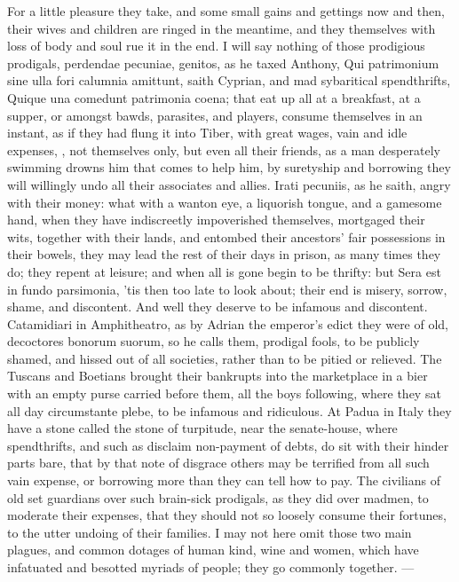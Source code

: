 {For a little pleasure they take, and some small gains and gettings now
and then, their wives and children are ringed in the meantime, and they
themselves with loss of body and soul rue it in the end. I will say
nothing of those prodigious prodigals, perdendae pecuniae, genitos, as
he  taxed Anthony, Qui patrimonium sine ulla fori calumnia
amittunt, saith Cyprian, and mad sybaritical spendthrifts,
Quique una comedunt patrimonia coena; that eat up all at a breakfast,
at a supper, or amongst bawds, parasites, and players, consume
themselves in an instant, as if they had flung it into Tiber,
with great wages, vain and idle expenses, \etc{}, not themselves only, but
even all their friends, as a man desperately swimming drowns him that
comes to help him, by suretyship and borrowing they will willingly undo
all their associates and allies.  Irati pecuniis, as he saith,
angry with their money: what with a wanton eye, a liquorish
tongue, and a gamesome hand, when they have indiscreetly impoverished
themselves, mortgaged their wits, together with their lands, and
entombed their ancestors' fair possessions in their bowels, they may
lead the rest of their days in prison, as many times they do; they
repent at leisure; and when all is gone begin to be thrifty: but Sera
est in fundo parsimonia, 'tis then too late to look about; their
end is misery, sorrow, shame, and discontent. And well they
deserve to be infamous and discontent. Catamidiari in
Amphitheatro, as by Adrian the emperor's edict they were of old,
decoctores bonorum suorum, so he calls them, prodigal fools, to be
publicly shamed, and hissed out of all societies, rather than to be
pitied or relieved. The Tuscans and Boetians brought their
bankrupts into the marketplace in a bier with an empty purse carried
before them, all the boys following, where they sat all day
circumstante plebe, to be infamous and ridiculous. At Padua in
Italy they have a stone called the stone of turpitude, near the
senate-house, where spendthrifts, and such as disclaim non-payment of
debts, do sit with their hinder parts bare, that by that note of
disgrace others may be terrified from all such vain expense, or
borrowing more than they can tell how to pay. The civilians of
old set guardians over such brain-sick prodigals, as they did over
madmen, to moderate their expenses, that they should not so loosely
consume their fortunes, to the utter undoing of their families.
I may not here omit those two main plagues, and common dotages of human
kind, wine and women, which have infatuated and besotted myriads of
people; they go commonly together.
---

}
